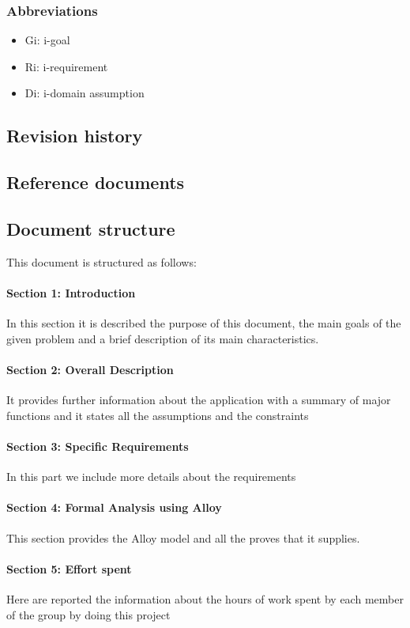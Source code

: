 \documentclass[12pt,titlepage]{article}
\begin{document}
\subsubsection{Abbreviations}\label{RASD}
\begin{itemize}
\item	Gi: i-goal
\item	Ri: i-requirement
\item	Di: i-domain assumption
\end{itemize}
\subsection{Revision history}\label{RASD}

\subsection{Reference documents}\label{RASD}

\subsection{Document structure}\label{RASD}
This document is structured as follows:
\paragraph{Section 1: Introduction}
In this section it is described the purpose of this document, the main goals of the given problem and a brief description of its main characteristics. 
\paragraph{Section 2: Overall Description}
It provides further information about the application with a summary of major functions and it states all the assumptions and the constraints 
\paragraph{Section 3: Specific Requirements}
In this part we include more details about the requirements 
\paragraph{Section 4: Formal Analysis using Alloy}
This section provides the Alloy model and all the proves that it supplies.
\paragraph{Section 5: Effort spent}
Here are reported the information about the hours of work spent by each member of the group by doing this project 
\end{document}
